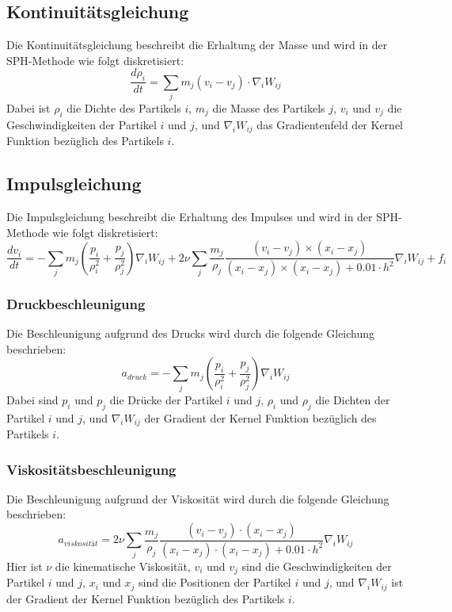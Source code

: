 \documentclass[a4paper, 12pt]{article}
\begin{document}
\subsection{Kontinuitätsgleichung}
Die Kontinuitätsgleichung beschreibt die Erhaltung der Masse und wird in der SPH-Methode wie folgt diskretisiert:
\[
\frac{d\rho_i}{dt} = \sum_j m_j (v_i - v_j) \cdot \nabla_i W_{ij}
\]
Dabei ist \(\rho_i\) die Dichte des Partikels \(i\), \(m_j\) die Masse des Partikels \(j\), \(v_i\) und \(v_j\) die Geschwindigkeiten der Partikel \(i\) und \(j\), und \(\nabla_i W_{ij}\) das Gradientenfeld der Kernel Funktion bezüglich des Partikels \(i\).

\subsection{Impulsgleichung}
Die Impulsgleichung beschreibt die Erhaltung des Impulses und wird in der SPH-Methode wie folgt diskretisiert:
\[
\frac{d v_i}{dt} = -\sum_j m_j \left( \frac{p_i}{\rho_i^2} + \frac{p_j}{\rho_j^2} \right) \nabla_i W_{ij} + 2 \nu \sum_j \frac{m_j}{\rho_j} \frac{(v_i - v_j) \times (x_i - x_j)}{(x_i - x_j) \times (x_i - x_j) + 0.01\cdot h^2} \nabla_i W_{ij} + f_i
\]

\subsubsection{Druckbeschleunigung}
Die Beschleunigung aufgrund des Drucks wird durch die folgende Gleichung beschrieben:
\begin{equation} \label{equ:druckBesch}
	a_{druck} = -\sum_j m_j \left( \frac{p_i}{\rho_i^2} + \frac{p_j}{\rho_j^2} \right) \nabla_i W_{ij}
\end{equation}
Dabei sind \( p_i \) und \( p_j \) die Drücke der Partikel \( i \) und \( j \), \(\rho_i \) und \(\rho_j \) die Dichten der Partikel \( i \) und \( j \), und \( \nabla_i W_{ij} \) der Gradient der Kernel Funktion bezüglich des Partikels \( i \).

\subsubsection{Viskositätsbeschleunigung}
Die Beschleunigung aufgrund der Viskosität wird durch die folgende Gleichung beschrieben:
\begin{equation} \label{equ:viskositätBesch}
	a_{viskosität} = 2 \nu \sum_j \frac{m_j}{\rho_j} \frac{(v_i - v_j) \cdot (x_i - x_j)}{(x_i - x_j) \cdot (x_i - x_j) + 0.01\cdot h^2} \nabla_i W_{ij}
\end{equation}
Hier ist \(\nu\) die kinematische Viskosität, \( v_i \) und \( v_j \) sind die Geschwindigkeiten der Partikel \( i \) und \( j \), \( x_i \) und \( x_j \) sind die Positionen der Partikel \( i \) und \( j \), und \(\nabla_i W_{ij}\) ist der Gradient der Kernel Funktion bezüglich des Partikels \( i \).
\end{document}
